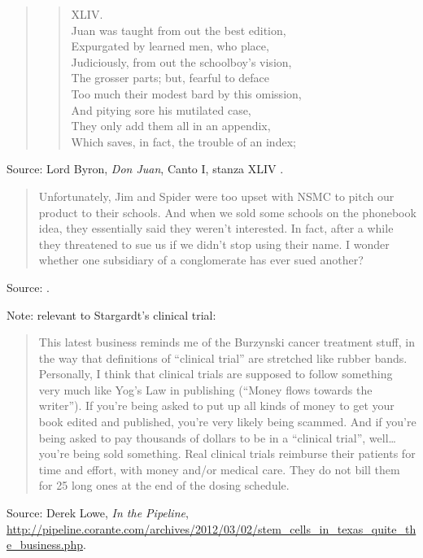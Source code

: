 \documentclass[a4paper]{article}
\begin{document}
\begin{quote}
	\begin{verse}
	XLIV. \\
	Juan was taught from out the best edition, \\
	Expurgated by learned men, who place, \\
	Judiciously, from out the schoolboy's vision, \\
	The grosser parts; but, fearful to deface \\
	Too much their modest bard by this omission, \\
	And pitying sore his mutilated case, \\
	They only add them all in an appendix, \\
	Which saves, in fact, the trouble of an index; \\
	\end{verse}
\end{quote}
Source: Lord Byron, \emph{Don Juan}, Canto I, stanza XLIV \citep[Canto I, stanza XLIV]{Byron1833}.
\medskip

\begin{quote}
	Unfortunately, Jim and Spider were too upset with NSMC to pitch our product to their schools.
And when we sold some schools on the phonebook idea, they essentially said they weren't interested.
In fact, after a while they threatened to sue us if we didn't stop using their name.  I wonder
whether one subsidiary of a conglomerate has ever sued another?
\end{quote}
Source: \cite[p.~113]{Tobias1970}.
\medskip

Note: relevant to Stargardt's clinical trial:
\begin{quote}
	This latest business reminds me of the Burzynski cancer treatment stuff, in the way that
definitions of ``clinical trial'' are stretched like rubber bands. Personally, I think that clinical
trials are supposed to follow something very much like Yog's Law in publishing (``Money flows
towards the writer''). If you're being asked to put up all kinds of money to get your book edited
and published, you're very likely being scammed. And if you're being asked to pay thousands of
dollars to be in a ``clinical trial'', well\ldots you're being sold something. Real clinical trials
reimburse their patients for time and effort, with money and/or medical care. They do not bill them
for 25 long ones at the end of the dosing schedule.
\end{quote}
Source: Derek Lowe, \emph{In the Pipeline},
\url{http://pipeline.corante.com/archives/2012/03/02/stem_cells_in_texas_quite_the_business.php}.
\medskip
\end{document}
